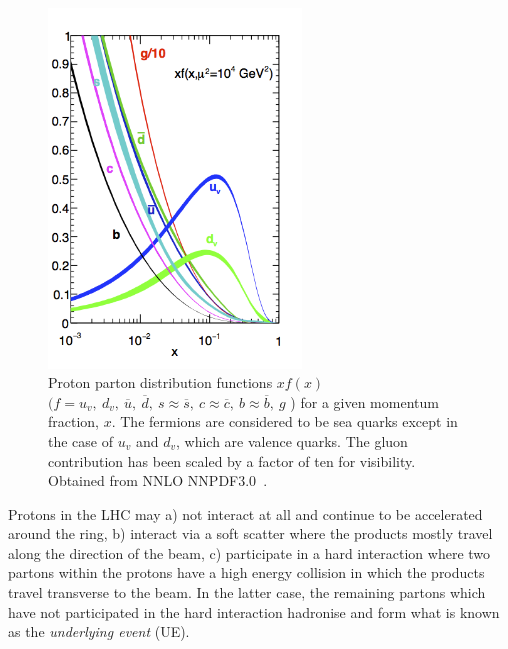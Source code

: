 \begin{figure}[ht!]
\begin{center}
    \includegraphics[width=0.6\textwidth]{images/Theory/pdfnob.png}
    \caption{Proton parton distribution functions $xf(x)$ $(f = u_{v},~ d_{v},~ \overline{u},~ \overline{d},~ s\approx\overline{s},~ c\approx\overline{c},~ b\approx\overline{b},~ g$ ) for a given momentum fraction, $x$. The fermions are considered to be sea quarks except in the case of $u_{v}$ and $d_{v}$, which are valence quarks. The gluon contribution has been scaled by a factor of ten for visibility. Obtained from NNLO NNPDF3.0~\cite{Ball2015}.}
    \label{fig:protonPDF}
\end{center}
\end{figure}

Protons in the LHC may a) not interact at all and continue to be accelerated around the ring, b) interact via a soft scatter where the products mostly travel along the direction of the beam, c) participate in a hard interaction where two partons within the protons have a high energy collision in which the products travel transverse to the beam. In the latter case, the remaining partons which have not participated in the hard interaction hadronise and form what is known as the \emph{underlying event} (UE).

